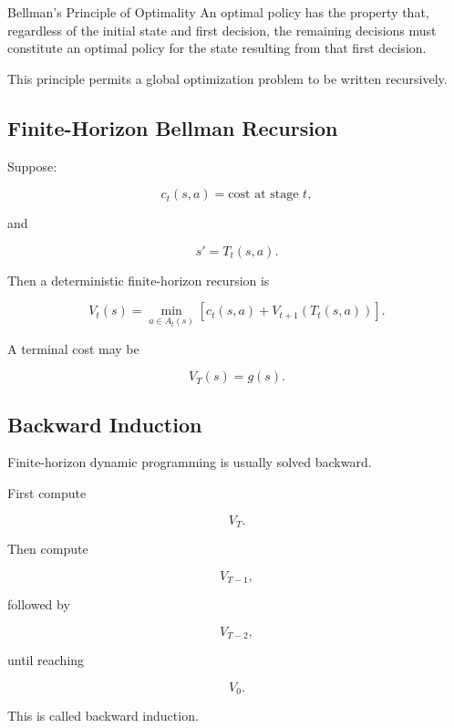 \begin{definitionbox}{Bellman's Principle of Optimality}
An optimal policy has the property that, regardless of the initial state
and first decision, the remaining decisions must constitute an optimal
policy for the state resulting from that first decision.
\end{definitionbox}

This principle permits a global optimization problem to be written
recursively.

\subsection{Finite-Horizon Bellman Recursion}
\label{subsec:finite-horizon-bellman-recursion}

Suppose:

\[
c_t(s,a)
=
\text{cost at stage }t,
\]

and

\[
s'
=
T_t(s,a).
\]

Then a deterministic finite-horizon recursion is

\[
\boxed{
V_t(s)
=
\min_{a\in A_t(s)}
\left[
c_t(s,a)
+
V_{t+1}
\left(
T_t(s,a)
\right)
\right].
}
\]

A terminal cost may be

\[
\boxed{
V_T(s)=g(s).
}
\]

\subsection{Backward Induction}
\label{subsec:backward-induction}

Finite-horizon dynamic programming is usually solved backward.

First compute

\[
V_T.
\]

Then compute

\[
V_{T-1},
\]

followed by

\[
V_{T-2},
\]

until reaching

\[
V_0.
\]

This is called backward induction.

